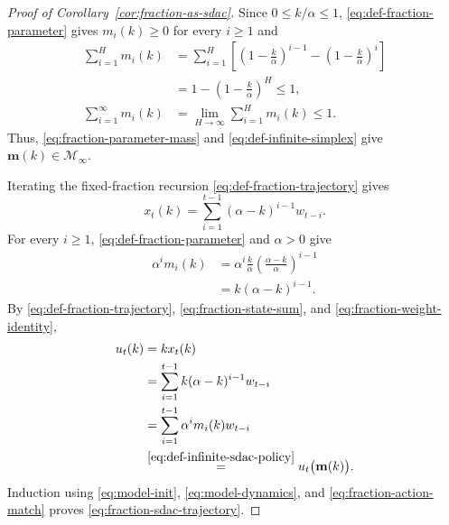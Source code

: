 \documentclass[journal]{IEEEtran}
\theoremstyle{remark}
\begin{document}
\begin{proof}[Proof of Corollary~\ref{cor:fraction-as-sdac}]
Since $0\le k/\alpha\le1$, \eqref{eq:def-fraction-parameter} gives
$m_i(k)\ge0$ for every $i\ge1$ and
\begin{equation}
\label{eq:fraction-parameter-mass}
\begin{aligned}
\sum_{i=1}^{H}m_i(k)
&=\sum_{i=1}^{H}\left[
\left(1-\frac{k}{\alpha}\right)^{i-1}
-\left(1-\frac{k}{\alpha}\right)^i\right]\\
&=1-\left(1-\frac{k}{\alpha}\right)^H\le1,\\
\sum_{i=1}^{\infty}m_i(k)
&=\lim_{H\to\infty}\sum_{i=1}^{H}m_i(k)\le1.
\end{aligned}
\end{equation}
Thus, \eqref{eq:fraction-parameter-mass} and
\eqref{eq:def-infinite-simplex} give $\mathbf{m}(k)\in\mathcal{M}_\infty$.

Iterating the fixed-fraction recursion \eqref{eq:def-fraction-trajectory}
gives
\begin{equation}
\label{eq:fraction-state-sum}
x_t(k)=\sum_{i=1}^{t-1}(\alpha-k)^{i-1}w_{t-i}.
\end{equation}
For every $i\ge1$, \eqref{eq:def-fraction-parameter} and $\alpha>0$ give
\begin{equation}
\label{eq:fraction-weight-identity}
\begin{aligned}
\alpha^i m_i(k)
&=\alpha^i\frac{k}{\alpha}
\left(\frac{\alpha-k}{\alpha}\right)^{i-1}\\
&=k(\alpha-k)^{i-1}.
\end{aligned}
\end{equation}
By \eqref{eq:def-fraction-trajectory}, \eqref{eq:fraction-state-sum},
and \eqref{eq:fraction-weight-identity},
\begin{equation}
\label{eq:fraction-action-match}
\begin{aligned}
u_t(k)&=kx_t(k)\\
&=\sum_{i=1}^{t-1}k(\alpha-k)^{i-1}w_{t-i}\\
&=\sum_{i=1}^{t-1}\alpha^i m_i(k)w_{t-i}\\
&\overset{\eqref{eq:def-infinite-sdac-policy}}{=}
u_t\bigl(\mathbf{m}(k)\bigr).
\end{aligned}
\end{equation}
Induction using \eqref{eq:model-init}, \eqref{eq:model-dynamics}, and
\eqref{eq:fraction-action-match} proves \eqref{eq:fraction-sdac-trajectory}.
\end{proof}
\end{document}

